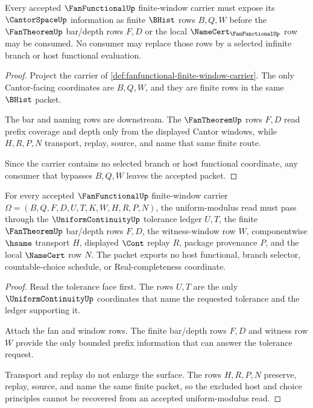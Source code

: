\begin{theorem}
\label{thm:fanfunctional-cantor-window-obligation}
Every accepted $\FanFunctionalUp$ finite-window carrier must expose its $\CantorSpaceUp$ information as finite $\BHist$ rows $B,Q,W$ before the $\FanTheoremUp$ bar/depth rows $F,D$ or the local $\NameCert_{\FanFunctionalUp}$ row may be consumed. No consumer may replace those rows by a selected infinite branch or host functional evaluation.
\end{theorem}
\begin{proof}
Project the carrier of \autoref{def:fanfunctional-finite-window-carrier}. The only Cantor-facing coordinates are $B,Q,W$, and they are finite rows in the same $\BHist$ packet.

The bar and naming rows are downstream. The $\FanTheoremUp$ rows $F,D$ read prefix coverage and depth only from the displayed Cantor windows, while $H,R,P,N$ transport, replay, source, and name that same finite route.

Since the carrier contains no selected branch or host functional coordinate, any consumer that bypasses $B,Q,W$ leaves the accepted packet.
\end{proof}

\begin{theorem}
\label{thm:fanfunctional-uniform-modulus-obligation}
For every accepted $\FanFunctionalUp$ finite-window carrier $\Omega=(B,Q,F,D,U,T,K,W,H,R,P,N)$, the uniform-modulus read must pass through the $\UniformContinuityUp$ tolerance ledger $U,T$, the finite $\FanTheoremUp$ bar/depth rows $F,D$, the witness-window row $W$, componentwise $\hsame$ transport $H$, displayed $\Cont$ replay $R$, package provenance $P$, and the local $\NameCert$ row $N$. The packet exports no host functional, branch selector, countable-choice schedule, or Real-completeness coordinate.
\end{theorem}
\begin{proof}
Read the tolerance face first. The rows $U,T$ are the only $\UniformContinuityUp$ coordinates that name the requested tolerance and the ledger supporting it.

Attach the fan and window rows. The finite bar/depth rows $F,D$ and witness row $W$ provide the only bounded prefix information that can answer the tolerance request.

Transport and replay do not enlarge the surface. The rows $H,R,P,N$ preserve, replay, source, and name the same finite packet, so the excluded host and choice principles cannot be recovered from an accepted uniform-modulus read.
\end{proof}

